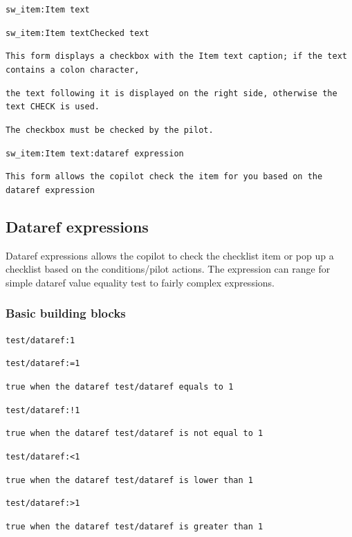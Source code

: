\documentclass[11pt,parskip=half,a4paper]{scrartcl}
\newcommand\textstyleSourceText[1]{\texttt{#1}}
\begin{document}
\textstyleSourceText{sw\_item:Item text}

\textstyleSourceText{sw\_item:Item text{\textbar}Checked text}

{\ttfamily
\textstyleSourceText{This form displays a checkbox with the {\textquotedbl}Item text{\textquotedbl} caption; if the text contains a colon character,}}

{\ttfamily
\textstyleSourceText{the text following it is displayed on the right side, otherwise the text
{\textquotedbl}CHECK{\textquotedbl} is used.}}

{\ttfamily
\textstyleSourceText{The checkbox must be checked by the pilot.}}

\textstyleSourceText{sw\_item:Item text:dataref expression}

{\ttfamily
\textstyleSourceText{This form allows the {\textquotedbl}copilot{\textquotedbl} check the item for you based on the dataref expression}}

\subsection[Dataref expressions]{Dataref expressions}
Dataref expressions allows the {\textquotedbl}copilot{\textquotedbl} to check the checklist item or pop up a checklist based on the conditions/pilot actions. The expression can range for simple dataref value equality test to fairly complex expressions.

\subsubsection{Basic building blocks}
\textstyleSourceText{test/dataref:1}

\textstyleSourceText{test/dataref:=1}

{\ttfamily
\textstyleSourceText{true when the dataref {\textquotedbl}test/dataref{\textquotedbl} equals to 1}}

\textstyleSourceText{test/dataref:!1}

{\ttfamily
\textstyleSourceText{true when the dataref {\textquotedbl}test/dataref{\textquotedbl} is not equal to 1}}

\textstyleSourceText{test/dataref:{\textless}1}

{\ttfamily
\textstyleSourceText{true when the dataref {\textquotedbl}test/dataref{\textquotedbl} is lower than 1}}

\textstyleSourceText{test/dataref:{\textgreater}1}

{\ttfamily
\textstyleSourceText{true when the dataref {\textquotedbl}test/dataref{\textquotedbl} is greater than 1}}
\end{document}
